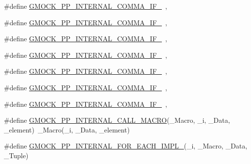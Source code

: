 \begin{DoxyCompactItemize}
\item 
\#define \mbox{\hyperlink{_obj__test_2lib_2googletest-master_2googlemock_2include_2gmock_2internal_2gmock-pp_8h_ab4914950cb2dc462f55a1e069ee9e8e6}{G\+M\+O\+C\+K\+\_\+\+P\+P\+\_\+\+I\+N\+T\+E\+R\+N\+A\+L\+\_\+\+C\+O\+M\+M\+A\+\_\+\+I\+F\+\_}}~,
\item 
\#define \mbox{\hyperlink{_obj__test_2lib_2googletest-master_2googlemock_2include_2gmock_2internal_2gmock-pp_8h_af15e9b374c945eaac237bd17583ba553}{G\+M\+O\+C\+K\+\_\+\+P\+P\+\_\+\+I\+N\+T\+E\+R\+N\+A\+L\+\_\+\+C\+O\+M\+M\+A\+\_\+\+I\+F\+\_}}~,
\item 
\#define \mbox{\hyperlink{_obj__test_2lib_2googletest-master_2googlemock_2include_2gmock_2internal_2gmock-pp_8h_a0d8f427b8f338b4157bf81f9989d69e2}{G\+M\+O\+C\+K\+\_\+\+P\+P\+\_\+\+I\+N\+T\+E\+R\+N\+A\+L\+\_\+\+C\+O\+M\+M\+A\+\_\+\+I\+F\+\_}}~,
\item 
\#define \mbox{\hyperlink{_obj__test_2lib_2googletest-master_2googlemock_2include_2gmock_2internal_2gmock-pp_8h_abf8465b714dfac3a485b3774264a005f}{G\+M\+O\+C\+K\+\_\+\+P\+P\+\_\+\+I\+N\+T\+E\+R\+N\+A\+L\+\_\+\+C\+O\+M\+M\+A\+\_\+\+I\+F\+\_}}~,
\item 
\#define \mbox{\hyperlink{_obj__test_2lib_2googletest-master_2googlemock_2include_2gmock_2internal_2gmock-pp_8h_a37b278fd32a872c53eb98c886888f442}{G\+M\+O\+C\+K\+\_\+\+P\+P\+\_\+\+I\+N\+T\+E\+R\+N\+A\+L\+\_\+\+C\+O\+M\+M\+A\+\_\+\+I\+F\+\_}}~,
\item 
\#define \mbox{\hyperlink{_obj__test_2lib_2googletest-master_2googlemock_2include_2gmock_2internal_2gmock-pp_8h_a1b3568514e11317780d63491765df95b}{G\+M\+O\+C\+K\+\_\+\+P\+P\+\_\+\+I\+N\+T\+E\+R\+N\+A\+L\+\_\+\+C\+O\+M\+M\+A\+\_\+\+I\+F\+\_}}~,
\item 
\#define \mbox{\hyperlink{_obj__test_2lib_2googletest-master_2googlemock_2include_2gmock_2internal_2gmock-pp_8h_ab768aec3f52e0f8c5825a45ad83d8836}{G\+M\+O\+C\+K\+\_\+\+P\+P\+\_\+\+I\+N\+T\+E\+R\+N\+A\+L\+\_\+\+C\+O\+M\+M\+A\+\_\+\+I\+F\+\_}}~,
\item 
\#define \mbox{\hyperlink{_obj__test_2lib_2googletest-master_2googlemock_2include_2gmock_2internal_2gmock-pp_8h_a3fe0cf255d103cc945cd91e0e953846f}{G\+M\+O\+C\+K\+\_\+\+P\+P\+\_\+\+I\+N\+T\+E\+R\+N\+A\+L\+\_\+\+C\+A\+L\+L\+\_\+\+M\+A\+C\+RO}}(\+\_\+\+Macro,  \+\_\+i,  \+\_\+\+Data,  \+\_\+element)~\+\_\+\+Macro(\+\_\+i, \+\_\+\+Data, \+\_\+element)
\item 
\#define \mbox{\hyperlink{_obj__test_2lib_2googletest-master_2googlemock_2include_2gmock_2internal_2gmock-pp_8h_afa4ea4d70383d332e2d2367b077ce31a}{G\+M\+O\+C\+K\+\_\+\+P\+P\+\_\+\+I\+N\+T\+E\+R\+N\+A\+L\+\_\+\+F\+O\+R\+\_\+\+E\+A\+C\+H\+\_\+\+I\+M\+P\+L\+\_}}(\+\_\+i,  \+\_\+\+Macro,  \+\_\+\+Data,  \+\_\+\+Tuple)

\end{DoxyCompactItemize}
